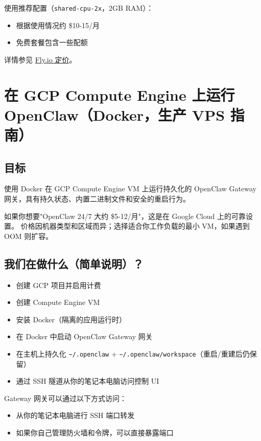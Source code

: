 使用推荐配置（\texttt{shared-cpu-2x}，2GB RAM）：

\begin{itemize}
  \item 根据使用情况约 \$10-15/月
  \item 免费套餐包含一些配额
\end{itemize}


详情参见 \href{https://fly.io/docs/about/pricing/}{Fly.io 定价}。


\clearpage

\section{在 GCP Compute Engine 上运行 OpenClaw（Docker，生产 VPS 指南）}


\subsection{目标}


使用 Docker 在 GCP Compute Engine VM 上运行持久化的 OpenClaw Gateway 网关，具有持久状态、内置二进制文件和安全的重启行为。

如果你想要"OpenClaw 24/7 大约 \$5-12/月"，这是在 Google Cloud 上的可靠设置。
价格因机器类型和区域而异；选择适合你工作负载的最小 VM，如果遇到 OOM 则扩容。

\subsection{我们在做什么（简单说明）？}


\begin{itemize}
  \item 创建 GCP 项目并启用计费
  \item 创建 Compute Engine VM
  \item 安装 Docker（隔离的应用运行时）
  \item 在 Docker 中启动 OpenClaw Gateway 网关
  \item 在主机上持久化 \texttt{\textasciitilde{}/.openclaw} + \texttt{\textasciitilde{}/.openclaw/workspace}（重启/重建后仍保留）
  \item 通过 SSH 隧道从你的笔记本电脑访问控制 UI
\end{itemize}


Gateway 网关可以通过以下方式访问：

\begin{itemize}
  \item 从你的笔记本电脑进行 SSH 端口转发
  \item 如果你自己管理防火墙和令牌，可以直接暴露端口
\end{itemize}


